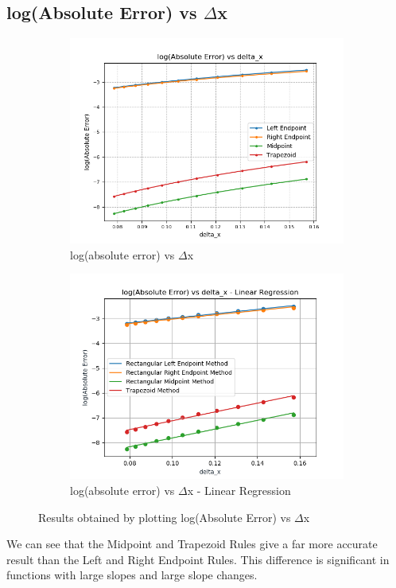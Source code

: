 \documentclass[11pt]{article}
\begin{document}
\subsection{log(Absolute Error) vs $\Delta$x}
\begin{figure} [h!]
	\centering
	\begin{subfigure}{0.55\textwidth}
		\centering
		\includegraphics[width=\linewidth]{log_abs_error}
		\caption{log(absolute error) vs $\Delta$x}
		\label{fig2:sub1}
	\end{subfigure}%
	\begin{subfigure}{0.55\textwidth}
		\centering
		\includegraphics[width=\linewidth]{log_error_vs_delta_x_Lin_Reg}
		\caption{log(absolute error) vs $\Delta$x - Linear Regression}
		\label{fig2:sub2}
	\end{subfigure}
	\caption{Results obtained by plotting log(Absolute Error) vs $\Delta$x}
\end{figure}
We can see that the Midpoint and Trapezoid Rules give a far more accurate result than the Left and Right Endpoint Rules. This difference is significant in functions with large slopes and large slope changes.\\
\end{document}
